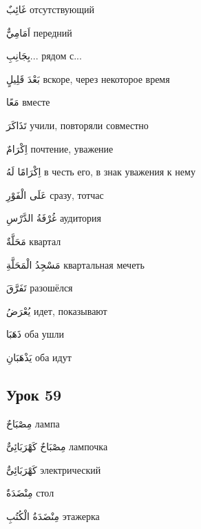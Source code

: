 \documentclass[a5paper]{article}
\newcommand\textstyleDropCaps[1]{#1}
\newcommand\textstyleCaptioncharacters[1]{#1}
\begin{document}
\textstyleCaptioncharacters{غَائِبٌ }\textstyleDropCaps{отсутствующий‎}

\textstyleCaptioncharacters{اَمَامِيٌّ }\textstyleDropCaps{передний‎}

\textstyleCaptioncharacters{بِجَانِبِ...ِ }\textstyleDropCaps{рядом с...‎}

\textstyleCaptioncharacters{بَعْدَ قَلِيلٍ }\textstyleDropCaps{вскоре, через некоторое время‎}

\textstyleCaptioncharacters{مَعًا }\textstyleDropCaps{вместе‎}

\textstyleCaptioncharacters{تَذَاكَرَ }\textstyleDropCaps{учили, повторяли совместно‎}

\textstyleCaptioncharacters{اِكْرَامٌ }\textstyleDropCaps{почтение, уважение‎}

\textstyleCaptioncharacters{اِكْرَامًا لَهُ }\textstyleDropCaps{в честь его, в знак уважения к нему‎}

\textstyleCaptioncharacters{عَلَى الْفَوْرِ }\textstyleDropCaps{сразу, тотчас‎}

\textstyleCaptioncharacters{غُرْفَةُ الدَّرْسِ }\textstyleDropCaps{аудитория‎}

\textstyleCaptioncharacters{مَحَلَّةٌ }\textstyleDropCaps{квартал‎}

\textstyleCaptioncharacters{مَسْجِدُ الْمَحَلَّةِ }\textstyleDropCaps{квар­тальная мечеть‎}

\textstyleCaptioncharacters{تَفَرَّقَ }\textstyleDropCaps{разошёлся‎}

\textstyleCaptioncharacters{يُعْرَضُ }\textstyleDropCaps{идет, показывают‎}

\textstyleCaptioncharacters{ذَهَبَا }\textstyleDropCaps{оба ушли‎}

\textstyleCaptioncharacters{يَذْهَبَانِ }\textstyleDropCaps{оба идут‎}

\subsection[Урок 59‎]{\textstyleDropCaps{Урок 59‎}}
\textstyleCaptioncharacters{مِصْبَاحٌ }\textstyleDropCaps{лампа‎}

\textstyleCaptioncharacters{مِصْبَاحٌ كَهْرَبَائِىٌّ }\textstyleDropCaps{лам­почка‎}

\textstyleCaptioncharacters{كَهْرَبَائِىٌّ }\textstyleDropCaps{электрический‎}

\textstyleCaptioncharacters{مِنْضَدَةٌ }\textstyleDropCaps{стол‎}

\textstyleCaptioncharacters{مِنْضَدَةُ الْكُتُبِ }\textstyleDropCaps{эта­жерка‎}
\end{document}
